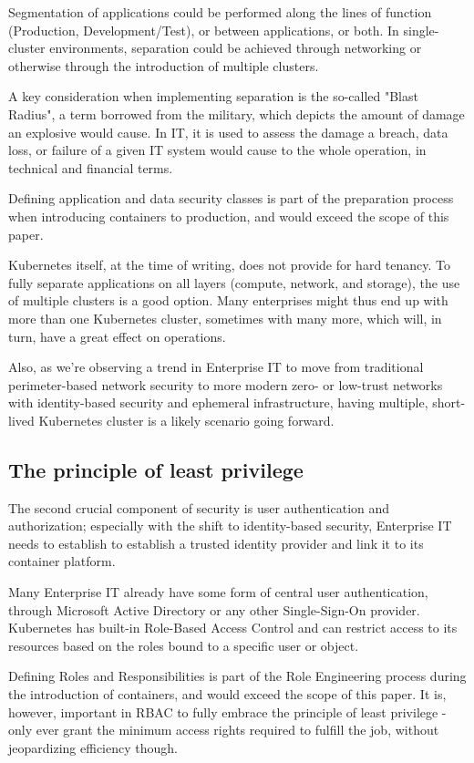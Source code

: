 Segmentation of applications could be performed along the lines of function (Production, Development/Test), or between applications, or both. In single-cluster environments, separation could be achieved through networking or otherwise through the introduction of multiple clusters. 

A key consideration when implementing separation is the so-called "Blast Radius", a term borrowed from the military, which depicts the amount of damage an explosive would cause. In IT, it is used to assess the damage a breach, data loss, or failure of a given IT system would cause to the whole operation, in technical and financial terms.

Defining application and data security classes is part of the preparation process when introducing containers to production, and would exceed the scope of this paper.

Kubernetes itself, at the time of writing, does not provide for hard tenancy. To fully separate applications on all layers (compute, network, and storage), the use of multiple clusters is a good option. Many enterprises might thus end up with more than one Kubernetes cluster, sometimes with many more, which will, in turn, have a great effect on operations.

Also, as we're observing a trend in Enterprise IT to move from traditional perimeter-based network security to more modern zero- or low-trust networks with identity-based security and ephemeral infrastructure, having multiple, short-lived Kubernetes cluster is a likely scenario going forward.

\subsection{The principle of least privilege}

The second crucial component of security is user authentication and authorization; especially with the shift to identity-based security, Enterprise IT needs to establish to establish a trusted identity provider and link it to its container platform.

Many Enterprise IT already have some form of central user authentication, through Microsoft Active Directory or any other Single-Sign-On provider. Kubernetes has built-in Role-Based Access Control and can restrict access to its resources based on the roles bound to a specific user or object.

Defining Roles and Responsibilities is part of the Role Engineering process during the introduction of containers, and would exceed the scope of this paper. It is, however, important in RBAC to fully embrace the principle of least privilege - only ever grant the minimum access rights required to fulfill the job, without jeopardizing efficiency though. 

